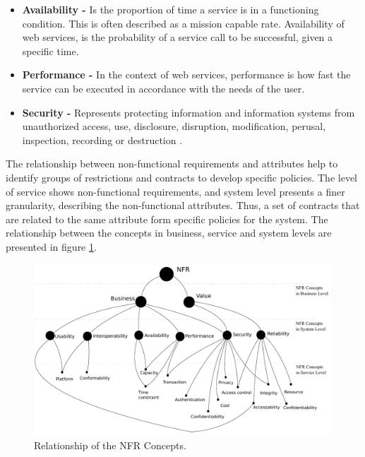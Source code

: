 \begin{itemize}
  \item \textbf{Availability -}   Is the proportion of time a service is in a functioning condition. This is often described as a mission capable rate. Availability of web services, is the probability of a service call 
  to be successful, given a specific time. 
  \item \textbf{Performance -} In the context of web services, performance is how fast the service can be
  executed in accordance with the needs of the user. 
  \item \textbf{Security -} Represents protecting information and
  information systems from unauthorized access, use, disclosure, disruption,
  modification, perusal, inspection, recording or destruction \cite{MylopoulosBook99}.  
\end{itemize}


The relationship between non-functional requirements and attributes help to
identify groups of restrictions and contracts to develop specific policies. The
level of service shows non-functional requirements, and system level presents a
finer granularity, describing the non-functional attributes. Thus, a set of
contracts that are related to the same attribute form specific policies for the
system. The relationship between the concepts in business, service and system
levels are presented in figure \ref{fig:nfr-relationship}.

\begin{figure}[ht!]  
\centering  
\includegraphics[width=0.99\textwidth]{chapters/state_ofthe_art/figs/nfrRelationship.pdf}
\caption{Relationship of the NFR Concepts.}
\label{fig:nfr-relationship}   
\end{figure}    
 
